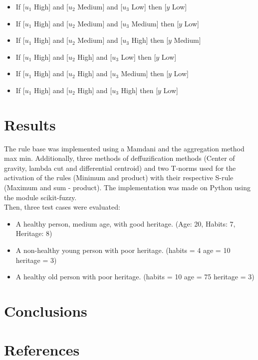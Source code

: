 \documentclass[conference]{IEEEtran}
\begin{document}
\begin{itemize}
\item If [$u_1$ High] and [$u_2$ Medium] and [$u_3$ Low] then [$y$ Low]
\item If [$u_1$ High] and [$u_2$ Medium] and [$u_3$ Medium] then [$y$ Low]
\item If [$u_1$ High] and [$u_2$ Medium] and [$u_3$ High] then [$y$ Medium]
\item If [$u_1$ High] and [$u_2$ High] and [$u_3$ Low] then [$y$ Low]
\item If [$u_1$ High] and [$u_2$ High] and [$u_3$ Medium] then [$y$ Low]
\item If [$u_1$ High] and [$u_2$ High] and [$u_3$ High] then [$y$ Low]
\end{itemize}

\section{Results}
The rule base was implemented using a Mamdani and the aggregation method max min. Additionally, three methods of deffuzification methods (Center of gravity, lambda cut and differential centroid) and two T-norms used for the activation of the rules (Minimum and product) with their respective S-rule (Maximum and sum - product). The implementation was made on Python using the module scikit-fuzzy. \\

Then, three test cases were evaluated:
\begin{itemize}
    \item A healthy person, medium age, with good heritage. (Age: 20, Habits: 7, Heritage: 8)
    \item A non-healthy young person with poor heritage. (habits = 4 age = 10 heritage = 3)
    \item A healthy old person with poor heritage. (habits = 10 age = 75 heritage = 3)
\end{itemize}

\section{Conclusions}

\section*{References}

\nocite{*}


\end{document}
